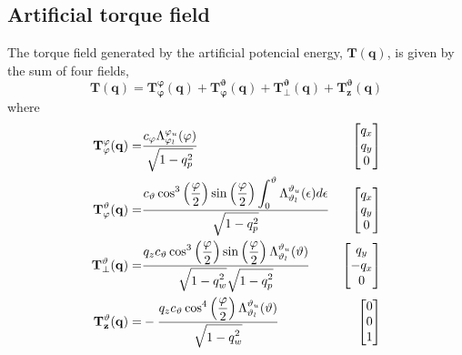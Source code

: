\documentclass{article}
\begin{document}
		\subsection{Artificial torque field}
			The torque field generated by the artificial potencial energy, $\mathbf{T(q)}$, is given by the sum of four fields, 
			\begin{equation}
				\mathbf{T(q)} = \mathbf{T_\varphi^\varphi(q)} + \mathbf{T_\varphi^\vartheta(q)} + \mathbf{T_\perp^\vartheta(q)} + \mathbf{T_z^\vartheta(q)}
				\label{torques}
			\end{equation}
			where
			\begin{eqnarray*}
				\mathbf{T_\varphi^\varphi(q)}  =& \displaystyle \displaystyle \frac{\displaystyle c_\varphi \Lambda_{\varphi_l}^{\varphi_u}(\varphi)}{\displaystyle\sqrt{1-q_p^2}} &\begin{bmatrix}
																		q_x\\
																		q_y\\
																		0
																	    \end{bmatrix}\\
				\mathbf{T_\varphi^\vartheta(q)}  =& \displaystyle \displaystyle \frac{\displaystyle c_\vartheta \cos^3\left (\displaystyle \frac{\varphi}{2} \right)\sin \left(\displaystyle \frac{\varphi}{2} \right) \displaystyle \int_0^\vartheta{\Lambda_{\vartheta_l}^{\vartheta_u}(\epsilon)} d\epsilon }{\displaystyle\sqrt{1-q_p^2}} &\begin{bmatrix}
										q_x\\
										q_y\\
										0
									    \end{bmatrix}\\
				\mathbf{T_\perp^\vartheta(q)}  =& \displaystyle \displaystyle \frac{\displaystyle q_z c_\vartheta \cos^3 \left(\displaystyle \frac{\varphi}{2} \right)\sin \left(\displaystyle \frac{\varphi}{2}\right) \Lambda_{\vartheta_l}^{\vartheta_u}(\vartheta)}{\displaystyle\sqrt{\displaystyle 1-q_w^2} \sqrt{\displaystyle 1-q_p^2}} &\begin{bmatrix}
										q_y\\
										-q_x\\
										0
									    \end{bmatrix}\\
				\mathbf{T_z^\vartheta(q)}  =& -\displaystyle \displaystyle \frac{\displaystyle q_z c_\vartheta \cos^4 \left(\displaystyle \frac{\varphi}{2} \right) \Lambda_{\vartheta_l}^{\vartheta_u}(\vartheta)}{\displaystyle \sqrt{\displaystyle 1-q_w^2} } &\begin{bmatrix}
											 0\\
											 0\\
											 1
										       \end{bmatrix}
			\end{eqnarray*}
\end{document}
